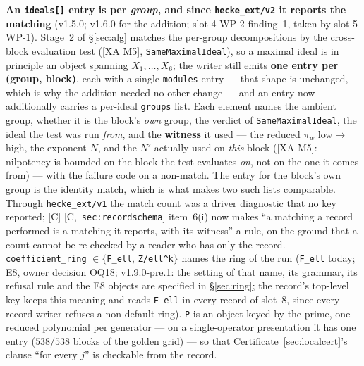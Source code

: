 \documentclass[11pt]{article}
\theoremstyle{remark}
\newcommand{\HA}[1]{[C,~\texttt{#1}]}      %
\begin{document}
\textbf{An \texttt{ideals[]} entry is per \emph{group}, and since
\texttt{hecke\_ext/v2} it reports the matching} (v1.5.0; v1.6.0 for the addition; slot-4
WP-2 finding~1, taken by slot-5 WP-1). Stage~2 of \S\ref{sec:alg} matches the per-group
decompositions by the cross-block evaluation test ([XA M5], \texttt{SameMaximalIdeal}), so
a maximal ideal is in principle an object spanning $X_1,\dots,X_6$; the writer still emits
\textbf{one entry per (group, block)}, each with a single \texttt{modules} entry --- that
shape is unchanged, which is why the addition needed no other change --- and an entry now
additionally carries a per-ideal \texttt{groups} list. Each element names the ambient group,
whether it is the block's \emph{own} group, the verdict of \texttt{SameMaximalIdeal}, the
ideal the test was run \emph{from}, and the \textbf{witness} it used --- the reduced $\pi_w$
low$\to$high, the exponent $N$, and the $N'$ actually used on \emph{this} block ([XA M5]:
nilpotency is bounded on the block the test evaluates \emph{on}, not on the one it comes
from) --- with the failure code on a non-match. The entry for the block's own group is the
identity match, which is what makes two such lists comparable. Through
\texttt{hecke\_ext/v1} the match count was a driver diagnostic that no key reported; [C]
\HA{sec:recordschema} item~6(i) now makes ``a matching a record performed is a matching it
reports, with its witness'' a rule, on the ground that a count cannot be re-checked by a
reader who has only the record.
\texttt{coefficient\_ring} $\in\{$\texttt{F\_ell}, \texttt{Z/ell\textasciicircum k}$\}$ names
the ring of the run (\texttt{F\_ell} today; E8, owner decision OQ18; v1.9.0-pre.1: the setting of
that name, its grammar, its refusal rule and the E8 objects are specified in \S\ref{sec:ring};
the record's top-level key keeps this meaning and reads \texttt{F\_ell} in every record of
slot~8, since every record writer refuses a non-default ring). \texttt{P} is an object
keyed by the prime, one reduced polynomial per generator --- on a single-operator presentation
it has one entry ($538/538$ blocks of the golden grid) --- so that
Certificate~\ref{sec:localcert}'s clause ``for every $j$'' is checkable from the record.
\end{document}
